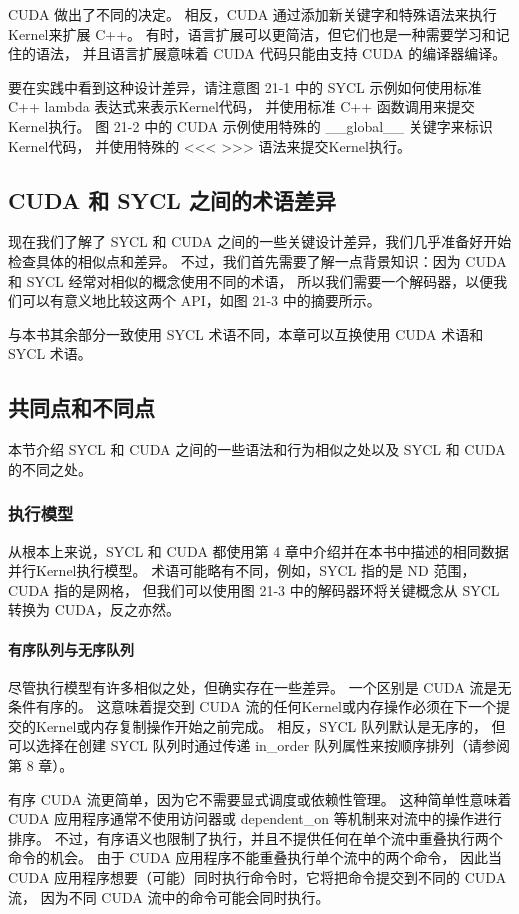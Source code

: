 CUDA 做出了不同的决定。 相反，CUDA 通过添加新关键字和特殊语法来执行Kernel来扩展 C++。 
有时，语言扩展可以更简洁，但它们也是一种需要学习和记住的语法，
并且语言扩展意味着 CUDA 代码只能由支持 CUDA 的编译器编译。

要在实践中看到这种设计差异，请注意图 21-1 中的 SYCL 示例如何使用标准 C++ lambda 表达式来表示Kernel代码，
并使用标准 C++ 函数调用来提交Kernel执行。 
图 21-2 中的 CUDA 示例使用特殊的 \_\_global\_\_ 关键字来标识Kernel代码，
并使用特殊的 <<< >>> 语法来提交Kernel执行。

\subsection{CUDA 和 SYCL 之间的术语差异}
现在我们了解了 SYCL 和 CUDA 之间的一些关键设计差异，我们几乎准备好开始检查具体的相似点和差异。 
不过，我们首先需要了解一点背景知识：因为 CUDA 和 SYCL 经常对相似的概念使用不同的术语，
所以我们需要一个解码器，以便我们可以有意义地比较这两个 API，如图 21-3 中的摘要所示。

与本书其余部分一致使用 SYCL 术语不同，本章可以互换使用 CUDA 术语和 SYCL 术语。

\subsection{共同点和不同点}
本节介绍 SYCL 和 CUDA 之间的一些语法和行为相似之处以及 SYCL 和 CUDA 的不同之处。

\subsubsection{执行模型}
从根本上来说，SYCL 和 CUDA 都使用第 4 章中介绍并在本书中描述的相同数据并行Kernel执行模型。 
术语可能略有不同，例如，SYCL 指的是 ND 范围，CUDA 指的是网格，
但我们可以使用图 21-3 中的解码器环将关键概念从 SYCL 转换为 CUDA，反之亦然。

\paragraph{有序队列与无序队列}

尽管执行模型有许多相似之处，但确实存在一些差异。 一个区别是 CUDA 流是无条件有序的。 
这意味着提交到 CUDA 流的任何Kernel或内存操作必须在下一个提交的Kernel或内存复制操作开始之前完成。 
相反，SYCL 队列默认是无序的，
但可以选择在创建 SYCL 队列时通过传递 in\_order 队列属性来按顺序排列（请参阅第 8 章）。

有序 CUDA 流更简单，因为它不需要显式调度或依赖性管理。 
这种简单性意味着 CUDA 应用程序通常不使用访问器或 dependent\_on 等机制来对流中的操作进行排序。 
不过，有序语义也限制了执行，并且不提供任何在单个流中重叠执行两个命令的机会。 
由于 CUDA 应用程序不能重叠执行单个流中的两个命令，
因此当 CUDA 应用程序想要（可能）同时执行命令时，它将把命令提交到不同的 CUDA 流，
因为不同 CUDA 流中的命令可能会同时执行。

